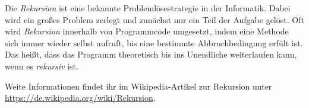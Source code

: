 Die \emph{Rekursion} ist eine bekannte Problemlösestrategie in der Informatik. Dabei wird ein großes Problem zerlegt und zunächst nur ein Teil der Aufgabe gelöst. Oft wird \emph{Rekursion} innerhalb von Programmcode umgesetzt, indem eine Methode sich immer wieder selbst aufruft, bis eine bestimmte Abbruchbedingung erfült ist. Das heißt, dass das Programm theoretisch bis ins Unendliche weiterlaufen kann, wenn es \emph{rekursiv} ist.

Weite Informationen findet ihr im Wikipedia-Artikel zur Rekursion unter \url{https://de.wikipedia.org/wiki/Rekursion}.